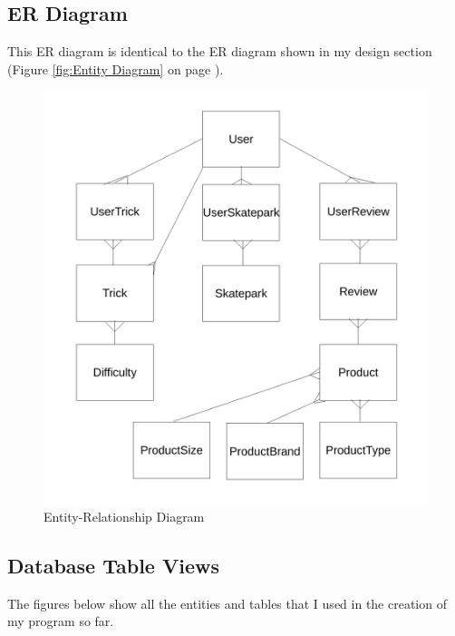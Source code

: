 \subsection{ER Diagram}

This ER diagram is identical to the ER diagram shown in my design section (Figure \ref{fig:Entity Diagram} on page \pageref{fig:Entity Diagram}).

\begin{figure}[H]
    \includegraphics[width=\textwidth]{./Design/EntityRelationships2.pdf}
    \caption{Entity-Relationship Diagram} \label{fig:Entity Diagram2}
\end{figure}







\subsection{Database Table Views}

The figures below show all the entities and tables that I used in the creation of my program so far.

